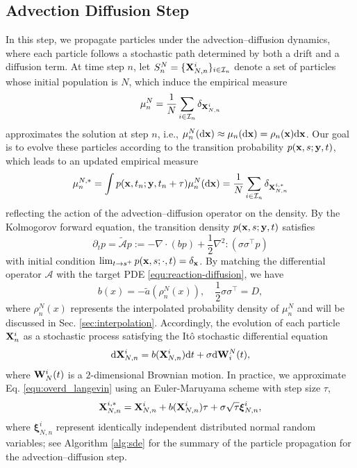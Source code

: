 \documentclass[a4paper,fleqn]{cas-sc}
\newcommand{\mhyphen}{\text{-}}
\theoremstyle{definition}
\theoremstyle{remark}
\begin{document}
\subsection{Advection Diffusion Step}
\label{sec:adevection_diffusion}
In this step, we propagate particles under the advection–diffusion dynamics, where each particle follows a stochastic path determined by both a drift and a diffusion term. At time step $n$, let $S^N_n = \{\mathbf{X}^i_{N,n}\}_{i\in \mathcal I_n}$ denote  a set of particles  whose initial population is $N$, which induce the empirical measure 
\[
\mu^N_{n}= \frac{1}{N}\sum_{i\in \mathcal I_n}\delta_{\mathbf{X}_{N,n}^i}
\] 
approximates the solution at step $n$, i.e.,  $\mu^N_{n} (\mathrm{d} \mathbf{x}) \approx \mu_n(\mathrm{d} \mathbf{x}) = \rho_n(\mathbf{x})\mathrm{d} \mathbf{x}$. 
Our goal is to evolve these particles according to the transition probability $p(\mathbf{x},s;\mathbf{y},t)$, which leads to an updated empirical measure
\[\mu_n^{N,*} = \int p(\mathbf{x},t_n;\mathbf{y},t_n+\tau)  \mu_n^N(\mathrm{d} \mathbf{x}) =   \frac{1}{N}\sum_{i\in \mathcal I_n}\delta_{\mathbf{X}_{N,n}^{i,*}}
\]  
reflecting the action of the advection--diffusion operator on the density.
By the Kolmogorov forward equation, the transition density $p(\mathbf{x},s;\mathbf{y},t)$ satisfies 
\begin{equation}
    \partial_t p = \tilde {\mathcal A }p := - \nabla \cdot(b  p) + \frac{1}{2}\nabla^2:(\sigma \sigma^\top p) 
\end{equation}
with initial condition $\lim_{t\to s^+} p(\mathbf{x},s;\cdot,t) = \delta_{\mathbf{x}}$. By matching the differential operator $\mathcal A$ with the target PDE \eqref{equ:reaction-diffusion}, we have 
\begin{equation}
    b(x) = -\tilde a(\rho^N_n(x)), \quad \frac{1}{2}\sigma \sigma^\top = D,
\end{equation}
where $\rho^N_n(x)$ represents the interpolated probability density of $\mu_n^N$ and will be discussed in Sec. \ref{sec:interpolation}.
%
Accordingly, the evolution of each particle $\mathbf{X}^i_n$ as a stochastic process satisfying the It\^o stochastic differential equation
\begin{equation}\label{equ:overd_langevin}
    \mathrm{d} \mathbf{X}_{N,n}^i = b(\mathbf{X}_{N,n}^i) \mathrm{d} t  + \sigma \mathrm{d} \mathbf{W}^N_{i}(t),
\end{equation}
where $\mathbf{W}^i_{N}(t)$ is a $2\mhyphen$dimensional Brownian motion. 
In practice, we approximate Eq. \eqref{equ:overd_langevin} using an Euler-Maruyama scheme with step size $\tau$, 
\begin{equation}
 \mathbf{X}_{N,n}^{i,*} = \mathbf{X}_{N,n}^{i} + b(\mathbf{X}_{N,n}^i) \tau  + \sigma \sqrt{\tau} \boldsymbol{\xi}^i_{N,n},
 \label{eq:euler_maruyama}
\end{equation}
where $\boldsymbol{\xi}^i_{N,n}$ represent identically independent distributed normal random variables; see Algorithm \ref{alg:sde} for the summary of the particle propagation for the advection--diffusion step. 
\end{document}
